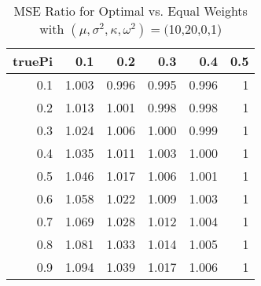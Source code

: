 \begin{table}

\caption{\label{tab:}MSE Ratio for Optimal vs. Equal Weights with $(\mu, \sigma^2, \kappa, \omega^2) = ($10,20,0,1)}
\centering
\begin{tabular}[t]{rrrrrr}
\toprule
truePi & 0.1 & 0.2 & 0.3 & 0.4 & 0.5\\
\midrule
0.1 & 1.003 & 0.996 & 0.995 & 0.996 & 1\\
0.2 & 1.013 & 1.001 & 0.998 & 0.998 & 1\\
0.3 & 1.024 & 1.006 & 1.000 & 0.999 & 1\\
0.4 & 1.035 & 1.011 & 1.003 & 1.000 & 1\\
0.5 & 1.046 & 1.017 & 1.006 & 1.001 & 1\\
0.6 & 1.058 & 1.022 & 1.009 & 1.003 & 1\\
0.7 & 1.069 & 1.028 & 1.012 & 1.004 & 1\\
0.8 & 1.081 & 1.033 & 1.014 & 1.005 & 1\\
0.9 & 1.094 & 1.039 & 1.017 & 1.006 & 1\\
\bottomrule
\end{tabular}
\end{table}
